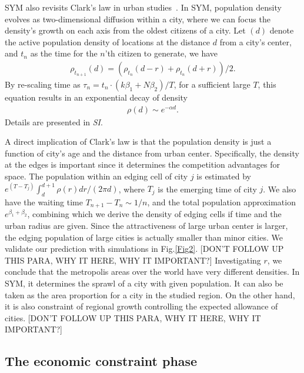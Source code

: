 \documentclass[reprint,unsortedaddress,amsmath,amssymb,aps,prl,showkeys]{revtex4-2}
\begin{document}
SYM also revisits Clark's law in urban studies~\cite{clark1951urban}. In SYM, population density evolves as two-dimensional diffusion within a city\cite{doi:10.1137/0150099}, where we can focus the density's growth on each axis from the oldest citizens of a city. Let $
(d)$ denote the active population density of locations at the distance $d$ from a city's center, and $t_n$ as the time for the $n$'th citizen to generate, we have 
\begin{align}
	\rho_{t_{n+1}}(d) = (\rho_{t_{n}}(d-r) + \rho_{t_{n}}(d+r) )/2.\label{loc_den}  
\end{align} By re-scaling time as $\tau_n = t_n\cdot (k\beta_1+N\beta_2)/T$, for a sufficient large $T$, this equation results in an exponential decay of density
\begin{align}
	\rho(d)\sim e^{-\alpha d}\label{clark_eq}.
\end{align} Details are presented in \textit{SI}. 

A direct implication of Clark's law is that the population density is just a function of city's age and the distance from urban center. Specifically, the density at the edges is important since it determines the competition advantages for space. The population within an edging cell of city $j$ is estimated by $e^{(T-T_j)}\int_{d}^{d+1}\rho(r)dr/(2\pi d)$, where $T_j$ is the emerging time of city $j$. We also have the waiting time $T_{n+1}-T_{n}\sim 1/n$, and the total population approximation $e^{\beta_1+\beta_2}$, combining which we derive the density of edging cells if time and the urban radius are given. Since the attractiveness of large urban center is larger, the edging population of large cities is actually smaller than minor cities. We validate our prediction with simulations in Fig.\@\ref{Fig2}. [DON'T FOLLOW UP THIS PARA, WHY IT HERE, WHY IT IMPORTANT?] %
Investigating $r$, we conclude that the metropolis areas over the world have very different densities. In SYM, it determines the sprawl of a city with given population. It can also be taken as the area proportion for a city in the studied region. On the other hand, it is also constraint of regional growth controlling the expected allowance of cities. [DON'T FOLLOW UP THIS PARA, WHY IT HERE, WHY IT IMPORTANT?]

\subsection{The economic constraint phase}
\end{document}
